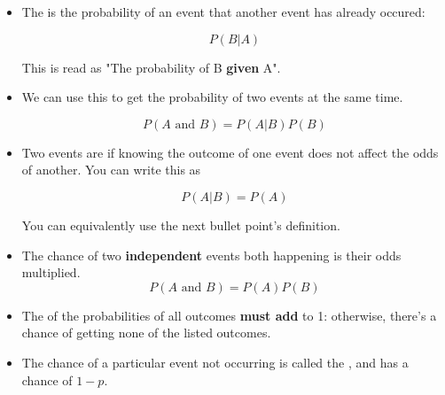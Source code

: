 \begin{itemize}
        \item The  is the probability of an event  that another event has already occured:
        
            \begin{equation}
                P(B|A)
            \end{equation}

        This is read as "The probability of B \textbf{given} A".

        \item We can use this to get the probability of two events at the same time.

            \begin{equation}
                P(A \text{ and } B)=P(A|B)P(B)
            \end{equation}
            
        
        
        \item Two events are  if knowing the outcome of one event does not affect the odds of another. You can write this as 
        
            \begin{equation}
                P(A|B)=P(A)
            \end{equation}
            
            You can equivalently use the next bullet point's definition.
        
        \item The chance of two \textbf{independent} events both happening is their odds multiplied.
            \begin{equation}
                P(A \text{ and } B) = P(A)P(B)
            \end{equation}

        
            
        \item The  of the probabilities of all outcomes \textbf{must add} to 1: otherwise, there's a chance of getting none of the listed outcomes.
        
        \item The chance of a particular event not occurring is called the , and has a chance of $1-p$.
        
        
            
    \end{itemize}
    
